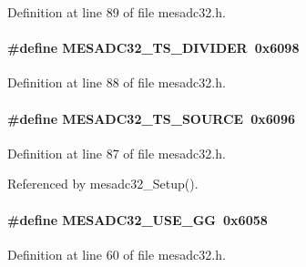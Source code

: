 Definition at line 89 of file mesadc32.h.
\paragraph[{MESADC32\_\-TS\_\-DIVIDER}]{\setlength{\rightskip}{0pt plus 5cm}\#define MESADC32\_\-TS\_\-DIVIDER~0x6098}\hfill\label{mesadc32_8h_a05fb25f18566079861029f5caa938896}


Definition at line 88 of file mesadc32.h.
\paragraph[{MESADC32\_\-TS\_\-SOURCE}]{\setlength{\rightskip}{0pt plus 5cm}\#define MESADC32\_\-TS\_\-SOURCE~0x6096}\hfill\label{mesadc32_8h_a1b950f7c3e5ebaf6e932a4d6790175f8}


Definition at line 87 of file mesadc32.h.

Referenced by mesadc32\_\-Setup().
\paragraph[{MESADC32\_\-USE\_\-GG}]{\setlength{\rightskip}{0pt plus 5cm}\#define MESADC32\_\-USE\_\-GG~0x6058}\hfill\label{mesadc32_8h_a75c12333addbebcc04968d2d334b01b8}


Definition at line 60 of file mesadc32.h.